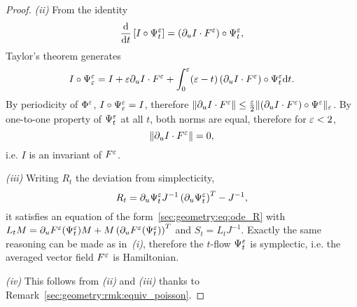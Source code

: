 \begin{proof}
%

\medskip\noindent%
\textit{(ii)}\indent%
From the identity 
\begin{equation*}
  \frac{\mathrm{d}}{\mathrm{d} t} \left[I \circ \Psi^{\varepsilon}_t\right] 
  = \left( \partial_u I \cdot F^{\varepsilon} \right) \circ \Psi^{\varepsilon}_t , 
\end{equation*}
Taylor's theorem generates 
\begin{equation*}
  I \circ \Psi^{\varepsilon}_{\varepsilon} 
  = I + \varepsilon \partial_u I \cdot F^{\varepsilon} + \int_0^{\varepsilon} (\varepsilon - t) 
    \left(\partial_u I \cdot F^{\varepsilon}\right) \circ \Psi^{\varepsilon}_t \mathrm{d} t .
\end{equation*}
By periodicity of $\Phi^{\varepsilon}$, $I \circ \Psi^{\varepsilon}_{\varepsilon} = I$, therefore $\|
\partial_u I \cdot F^{\varepsilon} \| \leq \frac{\varepsilon}{2} \| (\partial_u I \cdot F^{\varepsilon})
\circ \Psi^{\varepsilon} \|_{\varepsilon}$. By one-to-one property of $\Psi^{\varepsilon}_t$ at all
$t$, both norms are equal, therefore for $\varepsilon < 2$, 
\begin{equation*}
  \| \partial_u I \cdot F^{\varepsilon} \| = 0, 
\end{equation*}
i.e. $I$ is an invariant of $F^{\varepsilon}$. 

%

\medskip\noindent%
\textit{(iii)}\indent%
Writing $R_t$ the deviation from simplecticity, 
\begin{equation*}
  R_t = \partial_u \Psi_t^{\varepsilon} J^{-1} \left( \partial_u \Psi_t^{\varepsilon} \right) ^T 
  - J^{-1} ,
\end{equation*}
it satisfies an equation of the form~\eqref{sec:geometry:eq:ode_R} with
$L_t M = \partial_u F^{\varepsilon} ( \Psi_t^{\varepsilon} ) M + M \left( \partial_u F^{\varepsilon}
(\Psi_t^{\varepsilon} ) \right)^T $ and $S_t = L_t J^{-1}$. 
Exactly the same reasoning can be made as in~\textit{(i)}, therefore the
$t$-flow $\Psi^{\varepsilon}_t$ is symplectic, i.e. the averaged vector field
$F^{\varepsilon}$ is Hamiltonian. 

%

\medskip\noindent%
\textit{(iv)}\indent%
This follows from \textit{(ii)} and \textit{(iii)} thanks
to Remark~\ref{sec:geometry:rmk:equiv_poisson}. 

\end{proof}




